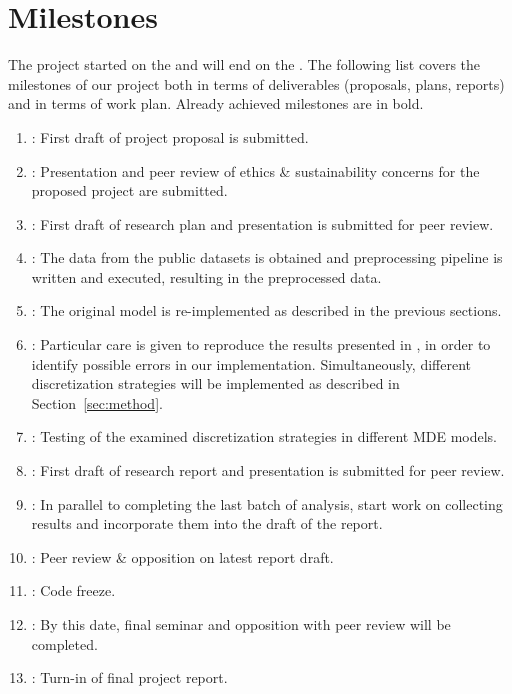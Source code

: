 \documentclass[12pt,twoside]{article}
\begin{document}
\section{Milestones}
The project started on the  and will end on the . The following list covers the milestones of our project both in terms of deliverables (proposals, plans, reports) and in terms of work plan. Already achieved milestones are in bold.
\begin{enumerate}
    \item \textbf{}: First draft of project proposal is submitted.
    \item \textbf{}: Presentation and peer review of ethics \& sustainability concerns for the proposed project are submitted.
    \item {}: First draft of research plan and presentation is submitted for peer review.
    \item {}: The data from the public datasets is obtained and preprocessing pipeline is written and executed, resulting in the preprocessed data.
    \item {}: The original model is re-implemented as described in the previous sections.
    \item {}: Particular care is given to reproduce the results presented in \cite{huan_fu_deep_2018}, in order to identify possible errors in our implementation. Simultaneously, different discretization strategies will be implemented as described in Section~\ref{sec:method}.
    \item {}: Testing of the examined discretization strategies in different MDE models.
    \item {}: First draft of research report and presentation is submitted for peer review.
    \item {}: In parallel to completing the last batch of analysis, start work on collecting results and incorporate them into the draft of the report.
    \item {}: Peer review \& opposition on latest report draft.
    \item {}: Code freeze.
    \item {}: By this date, final seminar and opposition with peer review will be completed.
    \item {}: Turn-in of final project report.
\end{enumerate}
\end{document}
